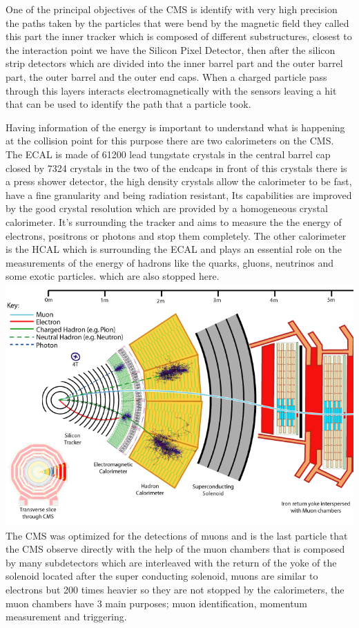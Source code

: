 One of the principal objectives of the CMS is identify with very high precision the paths taken by the particles that were bend by the magnetic field they called this part the inner tracker which is composed of different substructures, closest to the interaction point we have the Silicon Pixel Detector, then after the silicon strip detectors which are divided into the inner barrel part and the outer barrel part, the outer barrel and the outer end caps. When a charged particle pass through this layers interacts electromagnetically with the sensors leaving a hit that can be used to identify the path that a particle took. \cite{CMS1}


Having information of the energy is important to understand what is happening at the collision point for this purpose there are two calorimeters on the CMS. The ECAL is made of 61200 lead tungstate crystals in the central barrel cap closed by 7324 crystals in the two of the endcaps in front of this crystals there is a press shower detector, the high density crystals allow  the calorimeter to be fast, have a fine granularity and being radiation resistant, Its capabilities are improved by the good crystal resolution which are provided by a homogeneous crystal calorimeter. It's surrounding the tracker and aims to measure the the energy of electrons, positrons or photons and stop them completely. The other calorimeter is the HCAL which is surrounding the ECAL and plays an essential role on the measurements of the energy of hadrons like the quarks, gluons, neutrinos and some exotic particles. which are also stopped here.  
\\
\includegraphics[scale=0.35]{cms.png}
\\
The CMS was optimized for the detections of muons and is the last particle that the CMS observe directly with the help of the muon chambers that is composed by many subdetectors which are interleaved with the return of the yoke of the solenoid located after the super conducting solenoid, muons are similar to electrons but 200 times heavier so they are not stopped by the calorimeters, the muon chambers have 3 main purposes; muon identification, momentum measurement and triggering. \cite{CMS2}

